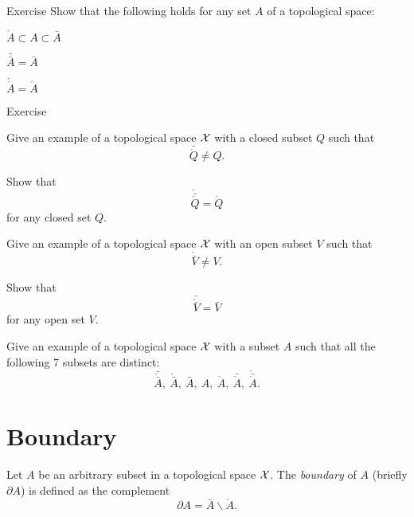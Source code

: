 \begin{thm}{Exercise}
Show that the following holds for any set $A$ of a topological space:

\begin{subthm}{}
$\mathring A\subset A\subset \bar A$
\end{subthm}

\begin{subthm}{}
$\bar{\bar A}=\bar A$
\end{subthm}

\begin{subthm}{}
$\mathring{\mathring A}=\mathring A$
\end{subthm}

\end{thm}

\begin{thm}{Exercise}

\begin{subthm}{}
Give an example of a topological space $\mathcal{X}$ with a closed subset $Q$ such that
 \[\bar{\mathring Q}\ne Q.\]
\end{subthm}

\begin{subthm}{}
Show that 
\[\mathring{\bar{\mathring Q}}=\mathring Q\]
for any closed set $Q$.
\end{subthm}

\begin{subthm}{}
Give an example of a topological space $\mathcal{X}$ with an open subset $V$ such that
 \[\mathring{\bar V}\ne V.\]
\end{subthm}

\begin{subthm}{}
Show that 
\[\bar{\mathring{\bar V}}=\bar V\]
for any open set $V$.
\end{subthm}

\begin{subthm}{}
 Give an example of a topological space $\mathcal{X}$ with a subset $A$ such that all the following 7 subsets are distinct:
\[\bar{\mathring{\bar A}},\ \mathring{\bar A},\ \bar A,\  A,\  \mathring A,\ \bar{\mathring A},\ \mathring{\bar{\mathring A}}.\]
\end{subthm}

\end{thm}

\section{Boundary}

Let $A$ be an arbitrary subset in a topological space $\mathcal{X}$.
The \emph{boundary} of $A$ (briefly $\partial A$) is defined as the complement 
\[\partial A=\bar A\backslash \mathring A.\]

